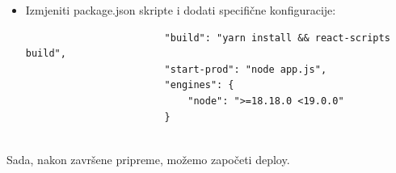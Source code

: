 \begin{packed_enum}
\begin{itemize}
\begin{lstlisting}
						const app = express();
						
						// Configuration
						const { PORT, HOST, API_BASE_URL } = process.env;
						
						// Proxy
						app.use(
						"/api",
						createProxyMiddleware({
							target: API_BASE_URL,
							changeOrigin: true,
						})
						);
						
						app.use(express.static(path.join(__dirname, 'build')));
						
						app.listen(PORT, HOST, () => {
							console.log(`Starting Proxy at ${HOST}:${PORT}`);
						});
						
						app.get("*", async (req, res) => {
							res.sendFile(path.join(__dirname, 'build', 'index.html'))
						});
						
					\end{lstlisting}
					\item Izmjeniti package.json skripte i dodati specifične konfiguracije:
					\begin{lstlisting}
						"build": "yarn install && react-scripts build",
						"start-prod": "node app.js",
						"engines": {
							"node": ">=18.18.0 <19.0.0"
						}
						
					\end{lstlisting}
				\end{itemize}
			\end{packed_enum}
			
			Sada, nakon završene pripreme, možemo započeti deploy.
			
